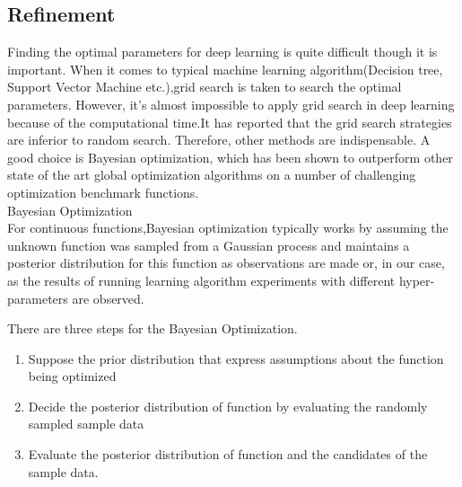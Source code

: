 \subsection{Refinement}

Finding the optimal parameters for deep learning is quite difficult though it is important. When it comes to typical machine learning algorithm(Decision tree, Support Vector Machine etc.),grid search is taken to search the optimal parameters. However, it's almost impossible to apply grid search in deep learning because of the computational time.It has reported that the grid search strategies are inferior to random search.\cite{Random} Therefore, other methods are indispensable. A good choice is Bayesian optimization, which has been shown to outperform other state of the art global optimization algorithms on a number of challenging optimization benchmark functions.\\

Bayesian Optimization\cite{Bayesian Optimization}\\


For continuous functions,Bayesian optimization typically works by assuming the unknown function was sampled from a Gaussian process and maintains a posterior distribution for this function as observations are made or, in our case, as the results of running learning algorithm experiments with different hyper-parameters are observed. 

There are three steps for the Bayesian Optimization.
\begin{enumerate}
 \item Suppose the prior distribution that express assumptions about the function being optimized
 \item Decide the posterior distribution of function by evaluating the randomly sampled sample data
 \item Evaluate the posterior distribution of function and the candidates of the sample data.
\end{enumerate}


